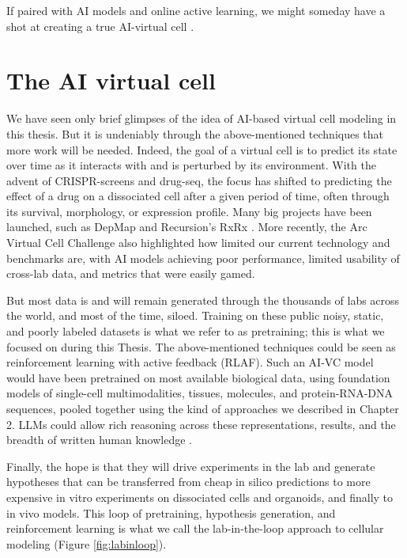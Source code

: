 If paired with AI models and online active learning, we might someday have a shot at creating a true AI-virtual cell \cite{cuiMultimodalFoundationModels2025}.

\section{The AI virtual cell}

We have seen only brief glimpses of the idea of AI-based virtual cell modeling in this thesis. But it is undeniably through the above-mentioned techniques that more work will be needed. Indeed, the goal of a virtual cell is to predict its state over time as it interacts with and is perturbed by its environment. With the advent of \gls{CRISPR}-screens and drug-seq, the focus has shifted to predicting the effect of a drug on a dissociated cell after a given period of time, often through its survival, morphology, or expression profile. Many big projects have been launched, such as DepMap \cite{arafehPresentFutureCancer2025} and Recursion's RxRx \cite{fayRxRx3PhenomicsMap2023}. More recently, the Arc Virtual Cell Challenge \cite{bunneHowBuildVirtual2024} also highlighted how limited our current technology and benchmarks are, with AI models achieving poor performance, limited usability of cross-lab data, and metrics that were easily gamed.

But most data is and will remain generated through the thousands of labs across the world, and most of the time, siloed. Training on these public noisy, static, and poorly labeled datasets is what we refer to as pretraining; this is what we focused on during this Thesis. The above-mentioned techniques could be seen as reinforcement learning with active feedback (RLAF). Such an AI-VC model would have been pretrained on most available biological data, using foundation models of single-cell multimodalities, tissues, molecules, and protein-RNA-DNA sequences, pooled together using the kind of approaches we described in Chapter 2. LLMs could allow rich reasoning across these representations, results, and the breadth of written human knowledge \cite{wangBiologicalReasoningReinforcement2025}.

Finally, the hope is that they will drive experiments in the lab and generate hypotheses that can be transferred from cheap in silico predictions to more expensive in vitro experiments on dissociated cells and organoids, and finally to in vivo models. This loop of pretraining, hypothesis generation, and reinforcement learning is what we call the lab-in-the-loop approach to cellular modeling (Figure \ref{fig:labinloop}).

